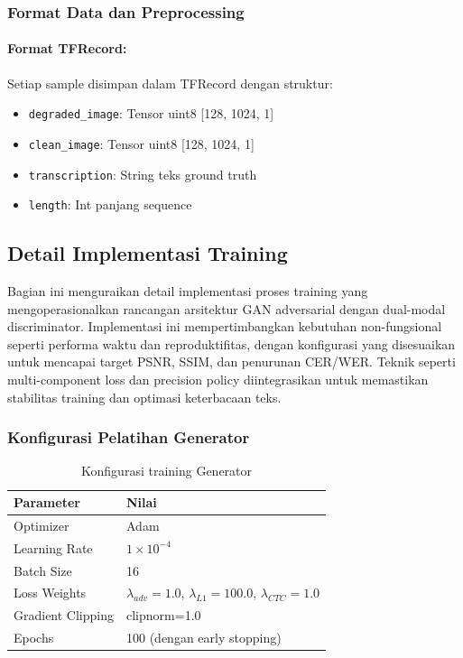 \documentclass[12pt,a4paper]{article}
\begin{document}
\subsubsection{Format Data dan Preprocessing}
\label{subsubsec:format-preprocessing}

\paragraph{Format TFRecord:}
Setiap sample disimpan dalam TFRecord dengan struktur:
\begin{itemize}
    \item \texttt{degraded\_image}: Tensor uint8 [128, 1024, 1]
    \item \texttt{clean\_image}: Tensor uint8 [128, 1024, 1]
    \item \texttt{transcription}: String teks ground truth
    \item \texttt{length}: Int panjang sequence
\end{itemize}

\subsection{Detail Implementasi Training}
\label{subsec:detail-implementasi-training}

Bagian ini menguraikan detail implementasi proses training yang mengoperasionalkan rancangan arsitektur GAN adversarial dengan dual-modal discriminator. Implementasi ini mempertimbangkan kebutuhan non-fungsional seperti performa waktu dan reproduktifitas, dengan konfigurasi yang disesuaikan untuk mencapai target PSNR, SSIM, dan penurunan CER/WER. Teknik seperti multi-component loss dan precision policy diintegrasikan untuk memastikan stabilitas training dan optimasi keterbacaan teks.

\subsubsection{Konfigurasi Pelatihan Generator}
\label{subsubsec:generator-training}

\begin{table}[H]
\centering
\caption{Konfigurasi training Generator}
\label{tab:generator-config}
\small
\begin{tabular}{|l|l|}
\hline
\textbf{Parameter} & \textbf{Nilai} \\
\hline
Optimizer & Adam \\
\hline
Learning Rate & $1 \times 10^{-4}$ \\
\hline
Batch Size & 16 \\
\hline
Loss Weights & $\lambda_{adv}=1.0$, $\lambda_{L1}=100.0$, $\lambda_{CTC}=1.0$ \\
\hline
Gradient Clipping & clipnorm=1.0 \\
\hline
Epochs & 100 (dengan early stopping) \\
\hline
\end{tabular}
\end{table}
\end{document}
